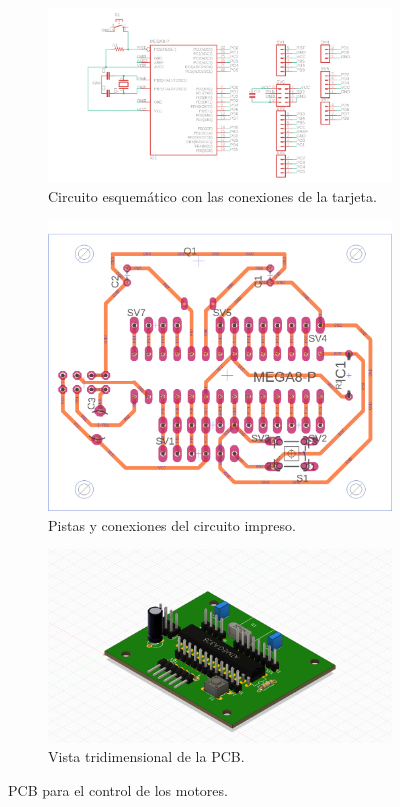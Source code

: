 \begin{figure}[htbp!]
	\centering
	\begin{subfigure}[htbp!]{0.4\textwidth}
		\includegraphics[width=\textwidth]{./Figuras/Esque}
		\caption{Circuito esquemático con las conexiones de la tarjeta.}
		\label{fig:Esque}
	\end{subfigure}
	\begin{subfigure}[htbp!]{0.25\textwidth}
		\includegraphics[width=\textwidth]{./Figuras/BRD}
		\caption{Pistas y conexiones del circuito impreso.}
		\label{fig:BRD}
	\end{subfigure}
	\begin{subfigure}[htbp!]{0.3\textwidth}
		\includegraphics[width=\textwidth]{./Figuras/PCB}
		\caption{Vista tridimensional de la PCB.}
		\label{fig:PCB}
	\end{subfigure}
	\caption{PCB para el control de los motores.}
\end{figure}
